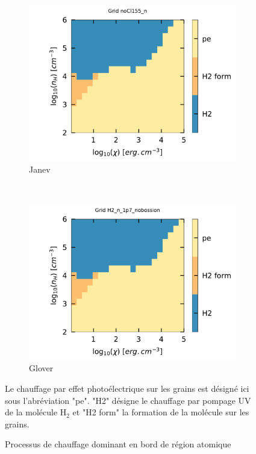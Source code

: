 \begin{figure}[!h]
    \centering
    \begin{subfigure}[t]{0.49\textwidth} %
        \centering \includegraphics[trim = {0 0 0 1cm },clip,width=1\textwidth]{figure/H2/grid_janev/mapGmax.pdf}
        \caption{Janev}
    \end{subfigure}
    ~ 
    \begin{subfigure}[t]{0.49\textwidth}
        \centering \includegraphics[trim = {0 0 0 1cm },clip,width=1\textwidth]{figure/H2/grid_glover/mapGmax.pdf}
        \caption{Glover}
    \end{subfigure}
    \caption{Processus de chauffage dominant en bord de région atomique}
    \begin{minipage}{\textwidth}
    Le chauffage par effet photoélectrique sur les grains est désigné ici sous l'abréviation "pe". "H2" désigne le chauffage par pompage UV de la molécule $\mathrm{H}_2$ et "H2 form" la formation de la molécule sur les grains.
    \end{minipage}
    \label{fig:H2:JanevGlover:Gmax}
    \hspace{1em}
    

\end{figure}
